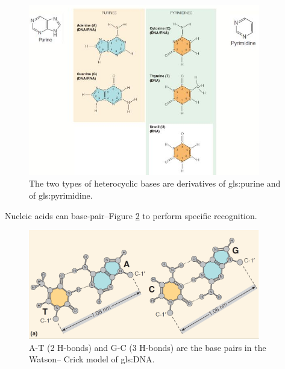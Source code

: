 \documentclass[]{article}
\begin{document}
\begin{figure}[H]
	\caption[The heterocyclic bases are
	derivatives of \gls{gls:purine} and of \gls{gls:pyrimidine}]{The two types of heterocyclic bases are
		derivatives of \gls{gls:purine} and of \gls{gls:pyrimidine}.}\label{fig:Nucleobases} 
	\includegraphics[width=0.9\textwidth]{Nucleobases}
\end{figure}

Nucleic acids can base-pair--Figure \ref{fig:BasePairs} to perform specific recognition.
\begin{figure}[H]
	\caption[A-T  and G-C are the base pairs in the Watson–
		Crick model]{A-T (2 H-bonds) and G-C (3 H-bonds) are the base pairs in the Watson–
		Crick model of \gls{gls:DNA}.}\label{fig:BasePairs} 
	\includegraphics[width=0.9\textwidth]{BasePairs}
\end{figure}
\end{document}
